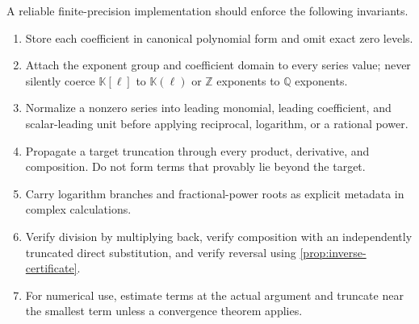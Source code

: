 \documentclass[11pt,oneside]{article}
\numberwithin{equation}{section}
\theoremstyle{definition}
\newcommand{\K}{\mathbb K}
\newcommand{\Q}{\mathbb Q}
\newcommand{\Z}{\mathbb Z}
\begin{document}
A reliable finite-precision implementation should enforce the following
invariants.

\begin{enumerate}
\item Store each coefficient in canonical polynomial form and omit exact zero
  levels.
\item Attach the exponent group and coefficient domain to every series value;
  never silently coerce \(\K[\ell]\) to \(\K(\ell)\) or \(\Z\) exponents to
  \(\Q\) exponents.
\item Normalize a nonzero series into leading monomial, leading coefficient,
  and scalar-leading unit before applying reciprocal, logarithm, or a rational
  power.
\item Propagate a target truncation through every product, derivative, and
  composition.  Do not form terms that provably lie beyond the target.
\item Carry logarithm branches and fractional-power roots as explicit metadata
  in complex calculations.
\item Verify division by multiplying back, verify composition with an
  independently truncated direct substitution, and verify reversal using
  \cref{prop:inverse-certificate}.
\item For numerical use, estimate terms at the actual argument and truncate
  near the smallest term unless a convergence theorem applies.
\end{enumerate}
\end{document}
